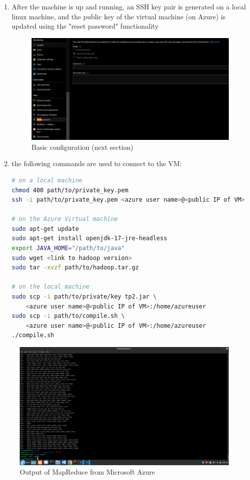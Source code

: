 \documentclass[11pt]{article}
\begin{document}
\begin{justifying}
\begin{enumerate}
    \item After the machine is up and running, an SSH key pair is generated on a local linux machine, and the public key of the virtual machine (on Azure) is updated using the "reset password" functionality
\begin{figure}[H]
    \centering
    \includegraphics[width=\linewidth]{Azure-reset-ssh.PNG}
    \caption{Basic configuration (next section)}
    \label{fig:mrazure}
\end{figure}
    \item the following commands are used to connect to the VM:
    \begin{lstlisting}[language=Bash]
# on a local machine
chmod 400 path/to/private_key.pem
ssh -i path/to/private_key.pem <azure user name>@<public IP of VM>

# on the Azure Virtual machine
sudo apt-get update
sudo apt-get install openjdk-17-jre-headless
export JAVA_HOME="/path/to/java"
sudo wget <link to hadoop version>
sudo tar -xvzf path/to/hadoop.tar.gz

# on the local machine
sudo scp -i path/to/private/key tp2.jar \
    <azure user name>@<public IP of VM>:/home/azureuser
sudo scp -i path/to/compile.sh \
    <azure user name>@<public IP of VM>:/home/azureuser
./compile.sh
\end{lstlisting}
\end{enumerate}

\begin{figure}[H]
    \includegraphics[width=\linewidth]{azure.png}
    \caption{Output of MapReduce from Microsoft Azure}
    \label{fig:mrazure}
\end{figure}

\end{justifying}
\end{document}
